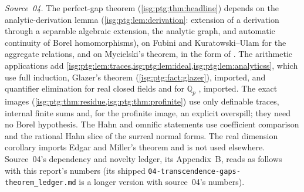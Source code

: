 \documentclass[11pt]{article}
\theoremstyle{definition}
\theoremstyle{remark}
\newcommand{\Qp}{\mathbb{Q}_p}
\newcommand{\fn}[1]{\nolinkurl{#1}}
\begin{document}
\emph{Source~04.} The perfect-gap theorem
(\cref{isg:ptg:thm:headline}) depends on the analytic-derivation lemma
(\cref{isg:ptg:lem:derivation}: extension of a derivation through a
separable algebraic extension, the analytic graph, and automatic continuity
of Borel homomorphisms), on Fubini and Kuratowski--Ulam for the aggregate
relations, and on Mycielski's theorem, in the form of
\cite[Theorem~1]{DolezalKubis}. The arithmetic applications add
\cref{isg:ptg:lem:traces,isg:ptg:lem:ideal,isg:ptg:lem:analyticss}, which
use full induction, Glazer's theorem (\cref{isg:ptg:fact:glazer}),
imported, and quantifier elimination for real closed fields and for $\Qp$
\cite{Macintyre}, imported. The exact images
(\cref{isg:ptg:thm:residue,isg:ptg:thm:profinite}) use only definable
traces, internal finite sums and, for the profinite image, an explicit
overspill; they need no Borel hypothesis. The Hahn and omnific statements
use coefficient comparison and the rational Hahn slice of the surreal
normal forms. The real dimension corollary imports Edgar and Miller's
theorem \cite{EdgarMiller} and is not used elsewhere. Source~04's
dependency and novelty ledger, its Appendix~B, reads as follows with this
report's numbers (its shipped \fn{04-transcendence-gaps-theorem_ledger.md}
is a longer version with source~04's numbers).
\begingroup\small
\end{document}
